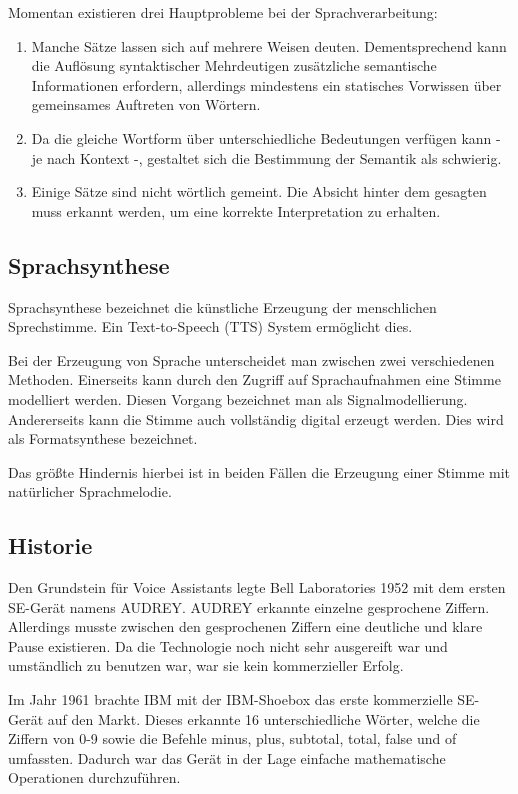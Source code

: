 Momentan existieren drei Hauptprobleme bei der Sprachverarbeitung:
\begin{enumerate}
	\item Manche Sätze lassen sich auf mehrere Weisen deuten. Dementsprechend kann die Auflösung syntaktischer Mehrdeutigen zusätzliche semantische Informationen erfordern, allerdings mindestens ein statisches Vorwissen über gemeinsames Auftreten von Wörtern.
	\item Da die gleiche Wortform über unterschiedliche Bedeutungen verfügen kann - je nach Kontext -, gestaltet sich die Bestimmung der Semantik als schwierig.
	\item Einige Sätze sind nicht wörtlich gemeint. Die Absicht hinter dem gesagten muss erkannt werden, um eine korrekte Interpretation zu erhalten.
\end{enumerate}

\subsection{Sprachsynthese}
Sprachsynthese bezeichnet die künstliche Erzeugung der menschlichen Sprechstimme. Ein Text-to-Speech (TTS) System ermöglicht dies.

Bei der Erzeugung von Sprache unterscheidet man zwischen zwei verschiedenen Methoden. Einerseits kann durch den Zugriff auf Sprachaufnahmen eine Stimme modelliert werden. Diesen Vorgang bezeichnet man als Signalmodellierung. Andererseits kann die Stimme auch vollständig digital erzeugt werden. Dies wird als Formatsynthese bezeichnet.

Das größte Hindernis hierbei ist in beiden Fällen die Erzeugung einer Stimme mit natürlicher Sprachmelodie.

\subsection{Historie}

Den Grundstein für Voice Assistants legte Bell Laboratories 1952 mit dem ersten SE-Gerät namens AUDREY. AUDREY erkannte einzelne gesprochene Ziffern. Allerdings musste zwischen den gesprochenen Ziffern eine deutliche und klare Pause existieren. Da die Technologie noch nicht sehr ausgereift war und umständlich zu benutzen war, war sie kein kommerzieller Erfolg.

Im Jahr 1961 brachte IBM mit der IBM-Shoebox das erste kommerzielle SE-Gerät auf den Markt. Dieses erkannte 16 unterschiedliche Wörter, welche die Ziffern von 0-9 sowie die Befehle minus, plus, subtotal, total, false und of umfassten. Dadurch war das Gerät in der Lage einfache mathematische Operationen durchzuführen.

